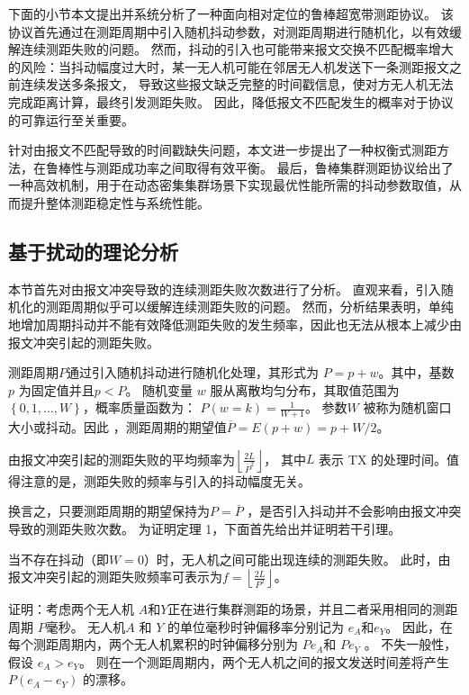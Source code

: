 下面的小节本文提出并系统分析了一种面向相对定位的鲁棒超宽带测距协议。
该协议首先通过在测距周期中引入随机抖动参数，对测距周期进行随机化，以有效缓解连续测距失败的问题。
然而，抖动的引入也可能带来报文交换不匹配概率增大的风险：当抖动幅度过大时，某一无人机可能在邻居无人机发送下一条测距报文之前连续发送多条报文，
导致这些报文缺乏完整的时间戳信息，使对方无人机无法完成距离计算，最终引发测距失败。
因此，降低报文不匹配发生的概率对于协议的可靠运行至关重要。

针对由报文不匹配导致的时间戳缺失问题，本文进一步提出了一种权衡式测距方法，在鲁棒性与测距成功率之间取得有效平衡。
最后，鲁棒集群测距协议给出了一种高效机制，用于在动态密集集群场景下实现最优性能所需的抖动参数取值，从而提升整体测距稳定性与系统性能。
\subsection{基于扰动的理论分析}
本节首先对由报文冲突导致的连续测距失败次数进行了分析。
直观来看，引入随机化的测距周期似乎可以缓解连续测距失败的问题。
然而，分析结果表明，单纯地增加周期抖动并不能有效降低测距失败的发生频率，因此也无法从根本上减少由报文冲突引起的测距失败。

\begin{definition}[抖动]
测距周期$P$通过引入随机抖动进行随机化处理，其形式为 $P = p + w$。其中，基数 $p$ 为固定值并且$p < P$。
随机变量 $w$ 服从离散均匀分布，其取值范围为 $\left\{0,1,…,W \right\}$，概率质量函数为：
$P(w=k)=\frac{1}{W+1}$。
参数$W$ 被称为随机窗口大小或抖动。因此 ，测距周期的期望值$\overline{P} = E(p + w) = p + W/2$。

\end{definition}

\begin{theorem}
由报文冲突引起的测距失败的平均频率为$\left\lfloor \frac{2L}{\overline{P}^{2}}\right\rfloor$，
其中$L$ 表示 TX 的处理时间。值得注意的是，测距失败的频率与引入的抖动幅度无关。
\end{theorem}

换言之，只要测距周期的期望保持为$P=\overline{P}$ ，是否引入抖动并不会影响由报文冲突导致的测距失败次数。
为证明定理 1，下面首先给出并证明若干引理。

\begin{lemma}
\label{lemma:nojitter}
当不存在抖动（即$W=0$）时，无人机之间可能出现连续的测距失败。
此时，由报文冲突引起的测距失败频率可表示为$f=\left\lfloor \frac{2L}{P^{2}}\right\rfloor$。
    \end{lemma}

证明：考虑两个无人机 $A$和$Y$正在进行集群测距的场景，并且二者采用相同的测距周期 $P$毫秒。
无人机$A$ 和 $Y$ 的单位毫秒时钟偏移率分别记为 $e_A$ ​ 和$e_Y$。
因此，在每个测距周期内，两个无人机累积的时钟偏移分别为 $Pe_A$  ​ 和 $Pe_Y$ 。 
不失一般性，假设 $e_A > e_Y$ ​ 。
则在一个测距周期内，两个无人机之间的报文发送时间差将产生 $P(e_A - e_Y)$ 的漂移。 

